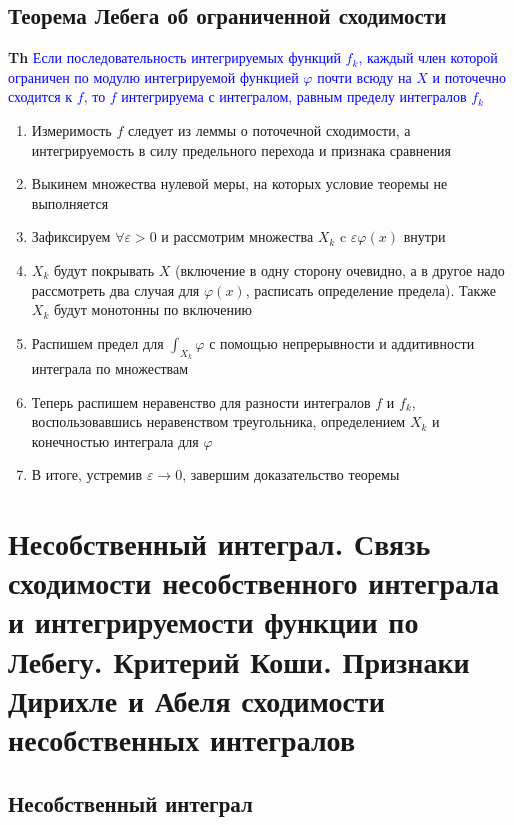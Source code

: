 \documentclass[a4paper, 14pt]{article}
\begin{document}
    \subsection{Теорема Лебега об ограниченной сходимости}

    \textbf{Th} \textcolor{blue}{Если последовательность интегрируемых функций $f_k$, каждый член которой ограничен по
    модулю интегрируемой функцией $\varphi$ почти всюду на $X$ и поточечно сходится к $f$, то $f$ интегрируема с
    интегралом, равным пределу интегралов $f_k$}

    \begin{enumerate}
        \item Измеримость $f$ следует из леммы о поточечной сходимости, а интегрируемость в силу предельного перехода и
        признака сравнения
        \item Выкинем множества нулевой меры, на которых условие теоремы не выполняется
        \item Зафиксируем $\forall \varepsilon > 0$ и рассмотрим множества $X_k$ c $\varepsilon \varphi(x)$ внутри
        \item $X_k$ будут покрывать $X$ (включение в одну сторону очевидно, а в другое надо рассмотреть два случая
        для $\varphi(x)$, расписать определение предела).
        Также $X_k$ будут монотонны по включению
        \item Распишем предел для $\int_{X_k} \varphi$ с помощью непрерывности и аддитивности интеграла по множествам
        \item Теперь распишем неравенство для разности интегралов $f$ и $f_k$, воспользовавшись неравенством
        треугольника, определением $X_k$ и конечностью интеграла для $\varphi$
        \item В итоге, устремив $\varepsilon \rightarrow 0$, завершим доказательство теоремы
    \end{enumerate}

    \section{Несобственный интеграл.
    Связь сходимости несобственного интеграла и интегрируемости функции по Лебегу.
    Критерий Коши.
    Признаки Дирихле и Абеля сходимости несобственных интегралов}

    \subsection{Несобственный интеграл}
\end{document}

